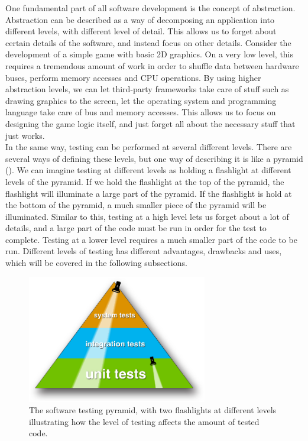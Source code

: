 
\label{sec:theory_levels}

One fundamental part of all software development is the concept of
abstraction. Abstraction can be described as a way of decomposing  an
application into different levels, with different level of detail. This
allows us to forget about certain details of the software, and  instead
focus on other details. Consider the development of a simple game with
basic 2D graphics. On a very low level, this requires a tremendous
amount of work in order to shuffle data between hardware buses, perform
memory accesses and CPU operations. By using higher abstraction levels,
we can let third-party frameworks take care of stuff such as drawing
graphics to the screen, let the operating system and programming
language take care of bus and memory accesses. This allows us to focus
on designing the game logic itself, and just forget all about the
necessary stuff that just works.\cite{paper:abstraction}\\

In the same way, testing can be performed at several different levels.
There are several ways of defining these levels, but one way of
describing it is like a pyramid (). We can
imagine testing at different levels as holding a flashlight at different
levels of the pyramid. If we hold the flashlight at the top of the
pyramid, the flashlight will illuminate a large part of the pyramid. If
the flashlight is hold at the bottom of the pyramid, a much smaller
piece of the pyramid will be illuminated. Similar to this, testing at a
high level lets us forget about a lot of details, and a large part of
the code must be run in order for the test to complete. Testing at a
lower level requires a much smaller part of the code to be run.
Different levels of testing has different advantages, drawbacks and
uses, which will be covered in the following subsections.\\

\begin{figure}
\centering
\includegraphics[width=0.7\textwidth]{theory/levels/triangle}
\caption{The software testing pyramid, with two flashlights at different
         levels illustrating how the level of testing affects the amount
         of tested code.}
\label{fig:testing_pyramid}
\end{figure}

